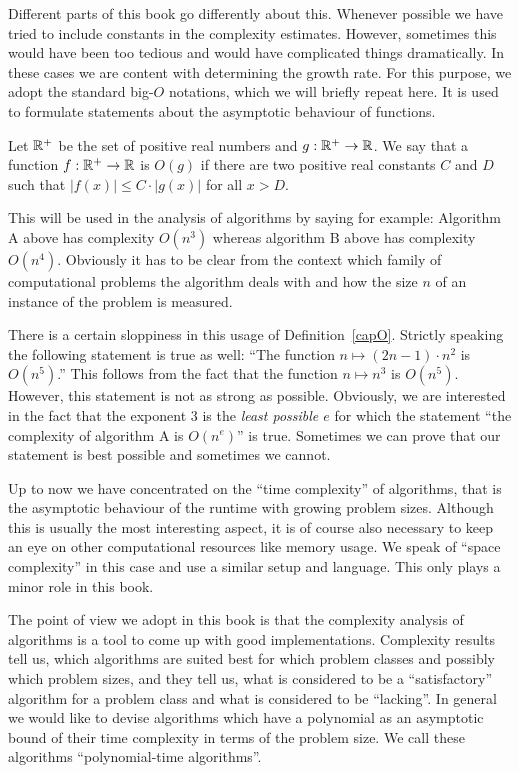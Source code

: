 Different parts of this book go differently about this. Whenever
possible we have tried to include constants in the complexity
estimates. However, sometimes this would have been too tedious and
would have complicated things dramatically. In these cases we are
content with determining the growth rate. For this purpose, we adopt
%
the standard big-$O$ notations, which we will briefly repeat here.
It is used to formulate statements about the asymptotic behaviour of
functions.

\begin{Def}
    \label{capO}%
    Let $\mathbb{R}^+$ be the set of positive real numbers and
    $g : \mathbb{R}^+ \to \mathbb{R}$.
    We say that a function $f : \mathbb{R}^+ \to \mathbb{R}$ is $O(g)$ if there are
    two positive real constants $C$ and $D$ such that 
    $|f(x)| \le C \cdot |g(x)|$ for all $x > D$.
\end{Def}

This will be used in the analysis of algorithms by saying for
example: Algorithm A above has complexity $O(n^3)$ whereas algorithm B
%
above has complexity $O(n^4)$. Obviously it has to be clear from the
context which family of computational problems the algorithm deals
with and how the size $n$ of an instance of the problem is measured.

There is a certain sloppiness in this usage of Definition~\ref{capO}.
Strictly speaking the following statement is true as well: 
``The function $n \mapsto (2n-1)\cdot n^2$ is $O(n^5)$.'' This follows
from the fact that the function $n \mapsto n^3$ is $O(n^5)$. However,
this statement is not as strong as possible. Obviously, we are
interested in the fact that the exponent $3$ is the \emph{least
possible $e$} for which the statement ``the complexity of algorithm A is
$O(n^e)$'' is true. Sometimes we can prove that our statement is best
possible and sometimes we cannot.

Up to now we have concentrated on the ``time complexity'' of
%
algorithms, that is the asymptotic behaviour of the runtime with
growing problem sizes. Although this is usually the most interesting
aspect, it is of course also necessary to keep an eye on other
computational resources like memory usage. We speak of ``space
complexity'' in this case and use a similar setup and language. This
%
only plays a minor role in this book.

The point of view we adopt in this book is that the complexity analysis of
algorithms is a tool to come up with good implementations. Complexity
results tell us, which algorithms are suited best for which problem
classes and possibly which problem sizes, and they tell us, what is
considered to be a ``satisfactory'' algorithm for a problem class and
what is considered to be ``lacking''. In general we would like to
devise algorithms which have a polynomial as an asymptotic bound of their
time complexity in terms of the problem size. We call these algorithms
``polynomial-time algorithms''.


